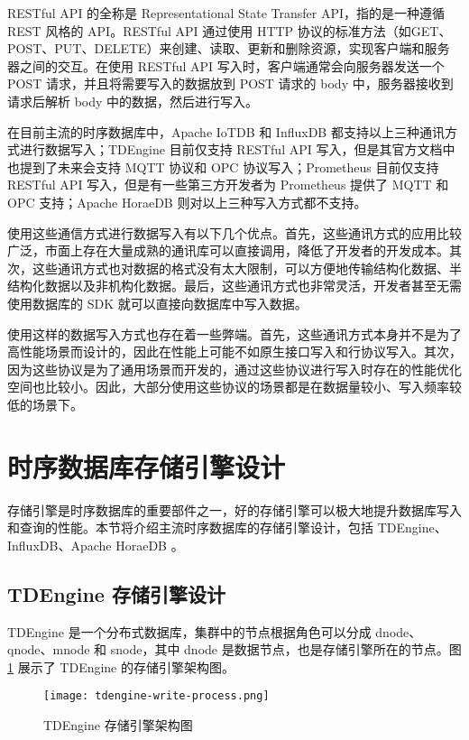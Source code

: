 RESTful API 的全称是 Representational State Transfer API，指的是一种遵循 REST 风格的 API。RESTful API 通过使用 HTTP 协议的标准方法（如GET、POST、PUT、DELETE）来创建、读取、更新和删除资源，实现客户端和服务器之间的交互。在使用 RESTful API 写入时，客户端通常会向服务器发送一个 POST 请求，并且将需要写入的数据放到 POST 请求的 body 中，服务器接收到请求后解析 body 中的数据，然后进行写入。

在目前主流的时序数据库中，Apache IoTDB 和 InfluxDB 都支持以上三种通讯方式进行数据写入；TDEngine 目前仅支持 RESTful API 写入，但是其官方文档中也提到了未来会支持 MQTT 协议和 OPC 协议写入；Prometheus 目前仅支持 RESTful API 写入，但是有一些第三方开发者为 Prometheus 提供了 MQTT 和 OPC 支持；Apache HoraeDB 则对以上三种写入方式都不支持。

使用这些通信方式进行数据写入有以下几个优点。首先，这些通讯方式的应用比较广泛，市面上存在大量成熟的通讯库可以直接调用，降低了开发者的开发成本。其次，这些通讯方式也对数据的格式没有太大限制，可以方便地传输结构化数据、半结构化数据以及非机构化数据。最后，这些通讯方式也非常灵活，开发者甚至无需使用数据库的 SDK 就可以直接向数据库中写入数据。

使用这样的数据写入方式也存在着一些弊端。首先，这些通讯方式本身并不是为了高性能场景而设计的，因此在性能上可能不如原生接口写入和行协议写入。其次，因为这些协议是为了通用场景而开发的，通过这些协议进行写入时存在的性能优化空间也比较小。因此，大部分使用这些协议的场景都是在数据量较小、写入频率较低的场景下。



\section{时序数据库存储引擎设计}
存储引擎是时序数据库的重要部件之一，好的存储引擎可以极大地提升数据库写入和查询的性能。本节将介绍主流时序数据库的存储引擎设计，包括 TDEngine、InfluxDB、Apache HoraeDB 。
\subsection{TDEngine 存储引擎设计}
TDEngine 是一个分布式数据库，集群中的节点根据角色可以分成 dnode、qnode、mnode 和 snode，其中 dnode 是数据节点，也是存储引擎所在的节点。图 \ref{fig:tdengine-write-process} 展示了 TDEngine 的存储引擎架构图。
\begin{figure}
  \centering
  \texttt{[image: tdengine-write-process.png]}
  \caption{TDEngine 存储引擎架构图\cite{tdengine2019arch}}
  \label{fig:tdengine-write-process}
\end{figure}


